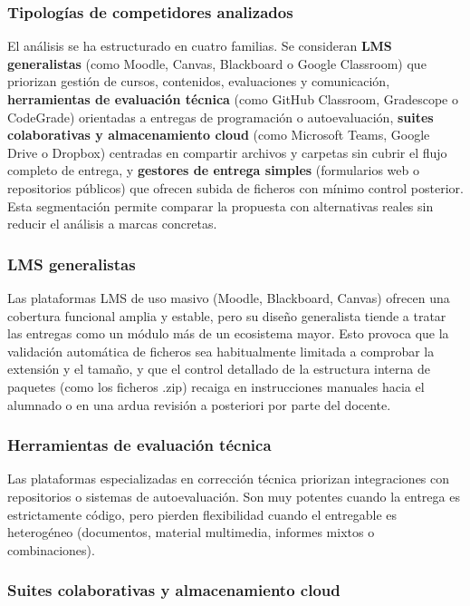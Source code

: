 \subsubsection{Tipolog\'ias de competidores analizados}

El an\'alisis se ha estructurado en cuatro familias. Se consideran \textbf{LMS generalistas} (como Moodle, Canvas, Blackboard o Google Classroom) que priorizan gesti\'on de cursos, contenidos, evaluaciones y comunicaci\'on, \textbf{herramientas de evaluaci\'on t\'ecnica} (como GitHub Classroom, Gradescope o CodeGrade) orientadas a entregas de programaci\'on o autoevaluaci\'on, \textbf{suites colaborativas y almacenamiento cloud} (como Microsoft Teams, Google Drive o Dropbox) centradas en compartir archivos y carpetas sin cubrir el flujo completo de entrega, y \textbf{gestores de entrega simples} (formularios web o repositorios p\'ublicos) que ofrecen subida de ficheros con m\'inimo control posterior. Esta segmentaci\'on permite comparar la propuesta con alternativas reales sin reducir el an\'alisis a marcas concretas.

\subsubsection{LMS generalistas}

Las plataformas LMS de uso masivo (Moodle, Blackboard, Canvas) ofrecen una cobertura funcional amplia y estable, pero su dise\~no generalista tiende a tratar las entregas como un m\'odulo m\'as de un ecosistema mayor. Esto provoca que la validaci\'on autom\'atica de ficheros sea habitualmente limitada a comprobar la extensi\'on y el tama\~no, y que el control detallado de la estructura interna de paquetes (como los ficheros .zip) recaiga en instrucciones manuales hacia el alumnado o en una ardua revisi\'on a posteriori por parte del docente.

\subsubsection{Herramientas de evaluaci\'on t\'ecnica}

Las plataformas especializadas en correcci\'on t\'ecnica priorizan
integraciones con repositorios o sistemas de autoevaluaci\'on.
Son muy potentes cuando la entrega es estrictamente c\'odigo,
pero pierden flexibilidad cuando el entregable es heterog\'eneo
(documentos, material multimedia, informes mixtos o combinaciones).

\subsubsection{Suites colaborativas y almacenamiento cloud}

